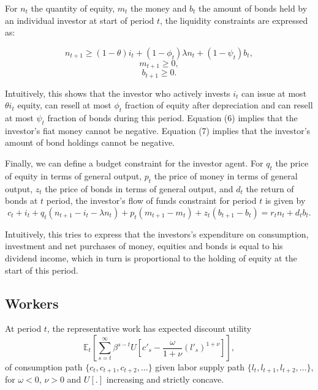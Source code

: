 \documentclass[12pt]{article}%
\begin{document}
For $n_t$ the quantity of equity, $m_t$ the money and $b_t$ the amount of bonds
held by an individual investor at start of period $t$, the liquidity constraints
are expressed as:

\begin{equation}
n_{t+1} \geq (1-\theta)i_{t} + (1-\phi_t)\lambda n_t + (1-\psi_t)b_t,
\end{equation}
\begin{equation}
m_{t+1} \geq 0,
\end{equation}
\begin{equation}
b_{t+1} \geq 0.
\end{equation}

Intuitively, this shows that the investor who actively invests $i_t$ can issue
at most $\theta i_t$ equity, can resell at most $\phi_t$ fraction of equity
after depreciation and can resell at most $\psi_t$ fraction of bonds during this
period. Equation (6) implies that the investor's fiat money cannot be negative.
Equation (7) implies that the investor's amount of bond holdings cannot be
negative.

Finally, we can define a budget constraint for the investor agent.
For $q_t$ the price of equity in terms of general output, $p_t$ the price of
money in terms of general output, $z_t$ the price of bonds in terms of
general output, and $d_t$ the return of bonds at $t$ period,  the investor's flow of funds constraint for period $t$ is given
by
\begin{equation}
c_t + i_t +q_t(n_{t+1}-i_t-\lambda n_t)+p_t (m_{t+1}-m_t)+z_t(b_{t+1}-b_t) = r_t
n_t + d_t b_t.
\end{equation}

Intuitively, this tries to express that the investors's expenditure on
consumption, investment and net purchases of money, equities and bonds is equal
to his dividend income, which in turn is proportional to the holding of equity at the
start of this period.
\subsection{Workers}
At period $t$, the representative work has expected discount utility
\begin{equation}
\mathbb{E}_t [\sum^{\infty}_{s=t} \beta^{s-t} U[c'_s - \frac{\omega}{1+\nu}(l'_s)^{1+\nu}]
],
\end{equation}
of consumption path $\{ c_t,c_{t+1}, c_{t+2}, \dots \}$ given labor supply path $\{ l_t,
l_{t+1}, l_{t+2}, \dots \}$, for $\omega < 0$, $\nu > 0$ and $U[.]$ increasing
and strictly concave.
\end{document}
